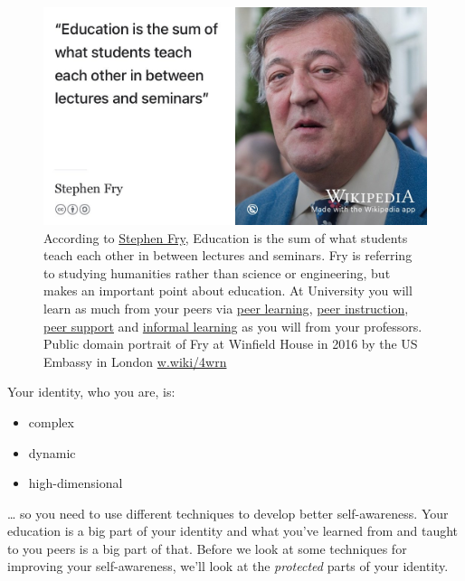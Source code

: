 \documentclass[
]{book}
\providecommand{\tightlist}{%
  \setlength{\itemsep}{0pt}\setlength{\parskip}{0pt}}
\begin{document}
\begin{figure}

{\centering \includegraphics[width=1\linewidth]{images/fry-lecture} 

}

\caption{According to \href{https://en.wikipedia.org/wiki/Stephen_Fry}{Stephen Fry}, Education is the sum of what students teach each other in between lectures and seminars. \citep{frychronicles} Fry is referring to studying humanities rather than science or engineering, but makes an important point about education. At University you will learn as much from your peers via \href{https://en.wikipedia.org/wiki/Peer_learning}{peer learning}, \href{https://en.wikipedia.org/wiki/Peer_instruction}{peer instruction}, \href{http://www.peersupport.manchester.ac.uk/}{peer support} and \href{https://en.wikipedia.org/wiki/Informal_learning}{informal learning} as you will from your professors. Public domain portrait of Fry at Winfield House in 2016 by the US Embassy in London \href{https://w.wiki/4wrn}{w.wiki/4wrn}}\label{fig:stephen-fry-lecture-fig}
\end{figure}



Your identity, who you are, is:

\begin{itemize}
\tightlist
\item
  complex
\item
  dynamic
\item
  high-dimensional
\end{itemize}

\ldots{} so you need to use different techniques to develop better self-awareness. Your education is a big part of your identity and what you've learned from and taught to you peers is a big part of that. Before we look at some techniques for improving your self-awareness, we'll look at the \emph{protected} parts of your identity.
\end{document}
